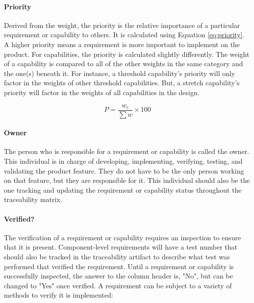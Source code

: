 \paragraph*{Priority} Derived from the weight, the priority is the relative importance of a particular requirement or capability to others.
It is calculated using Equation \ref{eq:priority}. 
A higher priority means a requirement is more important to implement on the product.
For capabilities, the priority is calculated slightly differently.
The weight of a capability is compared to all of the other weights in the same category and the one(s) beneath it.
For instance, a threshold capability's priority will only factor in the weights of other threshold capabilities.
But, a stretch capability's priority will factor in the weights of all capabilities in the design.

\begin{equation} \label{eq:priority}
    P = \frac{w_c}{\sum w} \times 100
\end{equation}

\paragraph*{Owner} The person who is responsible for a requirement or capability is called the owner.
This individual is in charge of developing, implementing, verifying, testing, and validating the product feature.
They do not have to be the only person working on that feature, but they are responsible for it.
This individual should also be the one tracking and updating the requirement or capability status throughout the traceability matrix. 

\paragraph*{Verified?} The verification of a requirement or capability requires an inspection to ensure that it is present.
Component-level requirements will have a test number that should also be tracked in the traceability artifact to describe what test was performed that verified the requirement.
Until a requirement or capability is successfully inspected, the answer to the column header is, "No", but can be changed to "Yes" once verified.
A requirement can be subject to a variety of methods to verify it is implemented:

